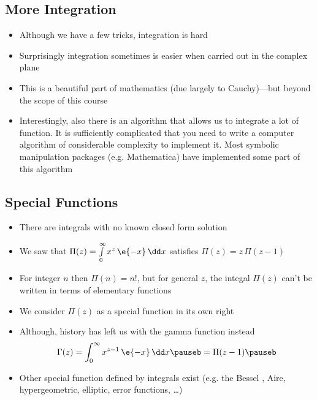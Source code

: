 \begin{slide}
\section[-1]{More Integration}

\begin{PauseHighLight}
  \begin{itemize}
  \item Although we have a few tricks, integration is hard\pause
  \item Surprisingly integration sometimes is easier when carried out
    in the complex plane\pause
  \item This is a beautiful part of mathematics\pause{} (due largely
    to Cauchy)\pauseb---but beyond the scope of this course\pauseb
  \item Interestingly, also there is an algorithm that allows us to
    integrate a lot of function\pause. It is sufficiently complicated
    that you need to write a computer algorithm of considerable
    complexity to implement it\pauseb.  Most symbolic manipulation
    packages (e.g. Mathematica) have implemented some part of this
    algorithm\pauseb
  \end{itemize}
\end{PauseHighLight}

\end{slide}


\begin{slide}
\section[-2]{Special Functions}

\begin{PauseHighLight}
  \begin{itemize}
  \item There are integrals with no known closed form solution\pause
  \item We saw that $\Pi(z) = \int\limits_0^\infty x^z\, \e{-x} \, \dd x$
    satisfies $\Pi(z) = z\,\Pi(z-1)$\pause
  \item For integer $n$ then $\Pi(n) = n!$\pause, but for general $z$,
    the integal $\Pi(z)$ can't be written in terms of elementary
    functions\pause
  \item We consider $\Pi(z)$ as a special function in its own
    right\pause
  \item Although, history has left us with the gamma function instead
    \begin{align*}
      \Gamma(z) = \int_0^\infty x^{z-1}\, \e{-x} \, \dd x\pauseb = \Pi(z-1)\pauseb
    \end{align*}
  \item Other special function defined by integrals exist (e.g. the
    Bessel , Aire, hypergeometric, elliptic, error functions, \ldots)\pauseb
  \end{itemize}
\end{PauseHighLight}

\end{slide}


